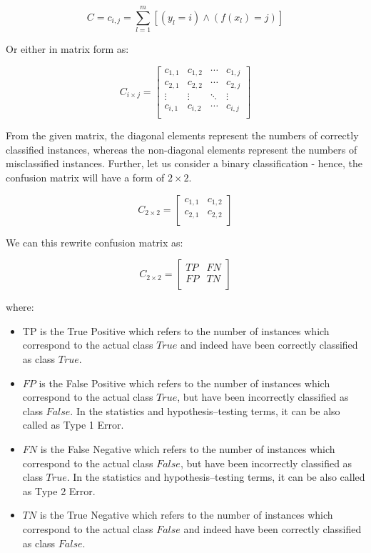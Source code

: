 \begin{equation}\label{eq}
C = {c_{i,j} = \sum_{l=1}^{m}[(y_l=i) \land (f(x_l)=j)]}
\end{equation}

Or either in matrix form as:

\begin{equation}\label{eq}
    C_{i \times j} = \begin{bmatrix}
    c_{1,1} & c_{1,2} & \cdots & c_{1,j} \\
    c_{2,1} & c_{2,2} & \cdots & c_{2,j} \\
    \vdots & \vdots & \ddots & \vdots \\
    c_{i,1} & c_{i,2} & \cdots & c_{i,j} \\
    \end{bmatrix}
\end{equation}

From the given matrix, the diagonal elements represent the numbers of correctly classified instances, whereas the non-diagonal elements represent the numbers of misclassified instances.
Further, let us consider a binary classification - hence, the confusion matrix will have a form of $2\times 2$.

\begin{equation}
    C_{2 \times 2} = \begin{bmatrix}
    c_{1,1} & c_{1,2} \\
    c_{2,1} & c_{2,2} \\
    \end{bmatrix}
\end{equation}


We can this rewrite confusion matrix as:

\begin{equation}
    C_{2 \times 2} = \begin{bmatrix}
    TP & FN \\
    FP & TN \\
    \end{bmatrix}
\end{equation}

where:
\begin{itemize}\setlength\itemsep{0em}
    \item TP is the True Positive which refers to the number of instances which correspond to the actual class $True$ and indeed have been correctly classified as class $True$.
	\item $FP$ is the False Positive which refers to the number of instances which correspond to the actual class $True$, but have been incorrectly classified as class $False$. In the statistics and hypothesis--testing terms, it can be also called as Type 1 Error.
	\item $FN$ is the False Negative which refers to the number of instances which correspond to the actual class $False$, but have been incorrectly classified as class $True$. In the statistics and hypothesis--testing terms, it can be also called as Type 2 Error.
	\item $TN$ is the True Negative which refers to the number of instances which correspond to the actual class $False$ and indeed have been correctly classified as class $False$.
\end{itemize}

